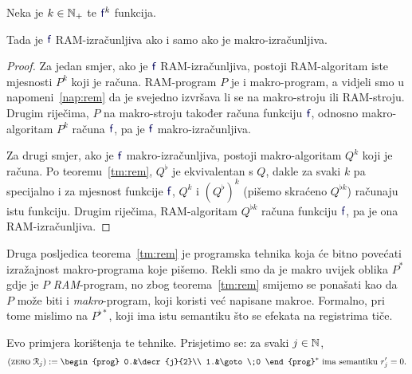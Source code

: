 \begin{korolar}[{name=[RAM-izračunljivost je ekvivalentna makro-izračunljivosti]}]\label{kor:rem}
Neka je $k\in{\mathbb N}_+$ te $\f f^k$ funkcija.

    Tada je $\f f$ RAM-izračunljiva ako i samo ako je makro-izračunljiva.
\end{korolar}
\begin{proof}
Za jedan smjer, ako je $\f f$ RAM-izračunljiva, postoji RAM-algoritam iste mjesnosti $P^k$ koji je računa.  RAM-program $P$ je i makro-program, a vidjeli smo u napomeni~\ref{nap:rem} da je svejedno izvršava li se na makro-stroju ili RAM-stroju. Drugim riječima, $P$ na makro-stroju također računa funkciju $\f f$, odnosno makro-algoritam $P^k$ računa $\f f$, pa je $\f f$ makro-izračunljiva.

Za drugi smjer, ako je $\f f$ makro-izračunljiva, postoji makro-algoritam $Q^k$ koji je računa. Po teoremu~\ref{tm:rem}, $Q^\flat$ je ekvivalentan s $Q$, dakle za svaki $k$ pa specijalno i za mjesnost funkcije $\f f$, $Q^k$ i $(Q^\flat)^k$ (pišemo skraćeno $Q^{\flat k}$) računaju istu funkciju. Drugim riječima, RAM-algoritam $Q^{\flat k}$ računa funkciju $\f f$, pa je ona RAM-izračunljiva.
\end{proof}

\begin{napomena}[{name=[makroi višeg reda]}]
Druga posljedica teorema~\ref{tm:rem} je programska tehnika koja će bitno povećati izražajnost makro-programa koje pišemo. Rekli smo da je makro uvijek oblika $P^*$ gdje je $P$ \emph{RAM}-program, no zbog teorema~\ref{tm:rem} smijemo se ponašati kao da $P$ može biti i \emph{makro}-program, koji koristi već napisane makroe. Formalno, pri tome mislimo na $P^{\flat*}$\!, koji ima istu semantiku što se efekata na registrima tiče.
\end{napomena}


Evo primjera korištenja te tehnike.
Prisjetimo se: za svaki $j\in{\mathbb N}$,
\begin{equation}
(\textsc{zero}\;\reg{j}):=\begin{prog}
0.&\decr{j}{2}\\
1.&\goto\;0
\end{prog}^*\text{
 ima semantiku $r_j'=0$.}
\end{equation}

